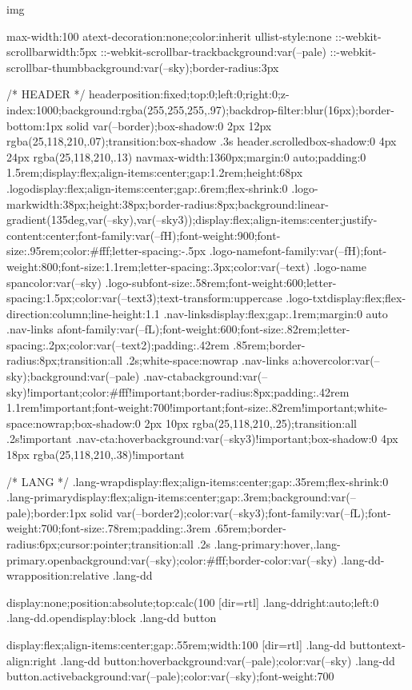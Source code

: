 img{max-width:100%
a{text-decoration:none;color:inherit}
ul{list-style:none}
::-webkit-scrollbar{width:5px}
::-webkit-scrollbar-track{background:var(--pale)}
::-webkit-scrollbar-thumb{background:var(--sky);border-radius:3px}

/* HEADER */
header{position:fixed;top:0;left:0;right:0;z-index:1000;background:rgba(255,255,255,.97);backdrop-filter:blur(16px);border-bottom:1px solid var(--border);box-shadow:0 2px 12px rgba(25,118,210,.07);transition:box-shadow .3s}
header.scrolled{box-shadow:0 4px 24px rgba(25,118,210,.13)}
nav{max-width:1360px;margin:0 auto;padding:0 1.5rem;display:flex;align-items:center;gap:1.2rem;height:68px}
.logo{display:flex;align-items:center;gap:.6rem;flex-shrink:0}
.logo-mark{width:38px;height:38px;border-radius:8px;background:linear-gradient(135deg,var(--sky),var(--sky3));display:flex;align-items:center;justify-content:center;font-family:var(--fH);font-weight:900;font-size:.95rem;color:#fff;letter-spacing:-.5px}
.logo-name{font-family:var(--fH);font-weight:800;font-size:1.1rem;letter-spacing:.3px;color:var(--text)}
.logo-name span{color:var(--sky)}
.logo-sub{font-size:.58rem;font-weight:600;letter-spacing:1.5px;color:var(--text3);text-transform:uppercase}
.logo-txt{display:flex;flex-direction:column;line-height:1.1}
.nav-links{display:flex;gap:.1rem;margin:0 auto}
.nav-links a{font-family:var(--fL);font-weight:600;font-size:.82rem;letter-spacing:.2px;color:var(--text2);padding:.42rem .85rem;border-radius:8px;transition:all .2s;white-space:nowrap}
.nav-links a:hover{color:var(--sky);background:var(--pale)}
.nav-cta{background:var(--sky)!important;color:#fff!important;border-radius:8px;padding:.42rem 1.1rem!important;font-weight:700!important;font-size:.82rem!important;white-space:nowrap;box-shadow:0 2px 10px rgba(25,118,210,.25);transition:all .2s!important}
.nav-cta:hover{background:var(--sky3)!important;box-shadow:0 4px 18px rgba(25,118,210,.38)!important}

/* LANG */
.lang-wrap{display:flex;align-items:center;gap:.35rem;flex-shrink:0}
.lang-primary{display:flex;align-items:center;gap:.3rem;background:var(--pale);border:1px solid var(--border2);color:var(--sky3);font-family:var(--fL);font-weight:700;font-size:.78rem;padding:.3rem .65rem;border-radius:6px;cursor:pointer;transition:all .2s}
.lang-primary:hover,.lang-primary.open{background:var(--sky);color:#fff;border-color:var(--sky)}
.lang-dd-wrap{position:relative}
.lang-dd{display:none;position:absolute;top:calc(100%
[dir=rtl] .lang-dd{right:auto;left:0}
.lang-dd.open{display:block}
.lang-dd button{display:flex;align-items:center;gap:.55rem;width:100%
[dir=rtl] .lang-dd button{text-align:right}
.lang-dd button:hover{background:var(--pale);color:var(--sky)}
.lang-dd button.active{background:var(--pale);color:var(--sky);font-weight:700}

}}}
